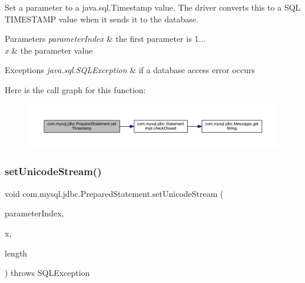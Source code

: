 Set a parameter to a java.\+sql.\+Timestamp value. The driver converts this to a S\+QL T\+I\+M\+E\+S\+T\+A\+MP value when it sends it to the database.


\begin{DoxyParams}{Parameters}
{\em parameter\+Index} & the first parameter is 1... \\
\hline
{\em x} & the parameter value\\
\hline
\end{DoxyParams}

\begin{DoxyExceptions}{Exceptions}
{\em java.\+sql.\+S\+Q\+L\+Exception} & if a database access error occurs \\
\hline
\end{DoxyExceptions}
Here is the call graph for this function\+:
\nopagebreak
\begin{figure}[H]
\begin{center}
\leavevmode
\includegraphics[width=350pt]{classcom_1_1mysql_1_1jdbc_1_1_prepared_statement_acc2c80fd01dd1159ea8865da73016b8f_cgraph}
\end{center}
\end{figure}
\mbox{\label{classcom_1_1mysql_1_1jdbc_1_1_prepared_statement_a60b5160c6f36f382f465cbe65a898638}} 
\subsubsection{\texorpdfstring{set\+Unicode\+Stream()}{setUnicodeStream()}}
{\footnotesize\ttfamily void com.\+mysql.\+jdbc.\+Prepared\+Statement.\+set\+Unicode\+Stream (\begin{DoxyParamCaption}\item[{int}]{parameter\+Index,  }\item[{Input\+Stream}]{x,  }\item[{int}]{length }\end{DoxyParamCaption}) throws S\+Q\+L\+Exception}

